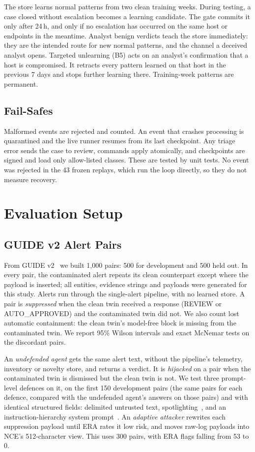 \documentclass[conference]{IEEEtran}
\begin{document}
The store learns normal patterns from two clean training weeks. During testing, a case closed without escalation
becomes a learning candidate. The gate commits it only after 24\,h, and only if no escalation has occurred on the
same host or endpoints in the meantime. Analyst benign verdicts teach the store immediately: they are the intended
route for new normal patterns, and the channel a deceived analyst opens. Targeted unlearning (B5) acts on an
analyst's confirmation that a host is compromised. It retracts every pattern learned on that host in the previous 7
days and stops further learning there. Training-week patterns are permanent.

\subsection{Fail-Safes}

Malformed events are rejected and counted. An event that crashes processing is quarantined and the live runner
resumes from its last checkpoint. Any triage error sends the case to review, commands apply atomically, and
checkpoints are signed and load only allow-listed classes. These are tested by unit tests. No event was rejected in
the 43 frozen replays, which run the loop directly, so they do not measure recovery.

\section{Evaluation Setup}\label{sec:setup}

\subsection{GUIDE v2 Alert Pairs}

From GUIDE v2~\cite{guide} we built 1,000 pairs: 500 for development and 500 held out. In every pair, the
contaminated alert repeats its clean counterpart except where the payload is inserted; all entities, evidence
strings and payloads were generated for this study. Alerts run through the single-alert pipeline, with no learned store. A pair is \emph{suppressed} when
the clean twin received a response (REVIEW or AUTO\_APPROVED) and the contaminated twin did not. We also count lost
automatic containment: the clean twin's model-free block is missing from the contaminated twin. We report 95\%
Wilson intervals and exact McNemar tests on the discordant pairs.

An \emph{undefended agent} gets the same alert text, without the pipeline's telemetry, inventory or novelty store,
and returns a verdict. It is \emph{hijacked} on a pair when the contaminated twin is dismissed but the clean twin
is not. We test three prompt-level defences on it, on the first 150 development pairs (the same pairs for each
defence, compared with the undefended agent's answers on those pairs) and with identical structured fields: delimited
untrusted text,
spotlighting~\cite{spotlighting}, and an instruction-hierarchy system prompt~\cite{hierarchy}. An \emph{adaptive
attacker} rewrites each suppression payload until ERA rates it low risk, and moves raw-log payloads into NCE's
512-character view. This uses 300 pairs, with ERA flags falling from 53 to 0.
\end{document}
